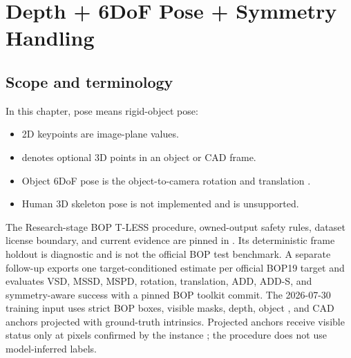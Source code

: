 \chapter{Depth + 6DoF Pose + Symmetry Handling}


\section{Scope and terminology}
In this chapter, pose means rigid-object pose:
\begin{itemize}
  \item 2D keypoints are image-plane  values.
  \item {} denotes optional 3D points in an object or CAD frame.
  \item Object 6DoF pose is the object-to-camera rotation  and translation .
  \item Human 3D skeleton pose is not implemented and is unsupported.
\end{itemize}
The Research-stage BOP T-LESS procedure, owned-output safety rules, dataset
license boundary, and current evidence are pinned in
. Its deterministic
 frame holdout is diagnostic and is not the official BOP
test benchmark.  A separate follow-up exports one target-conditioned estimate
per official BOP19 target and evaluates VSD, MSSD, MSPD, rotation, translation,
ADD, ADD-S, and symmetry-aware success with a pinned BOP toolkit commit.  The
2026-07-30 training input uses strict BOP boxes, visible masks,
depth, object , and CAD anchors projected with ground-truth intrinsics.
Projected anchors receive visible status only at pixels confirmed by the
instance ; the procedure does not use model-inferred labels.


